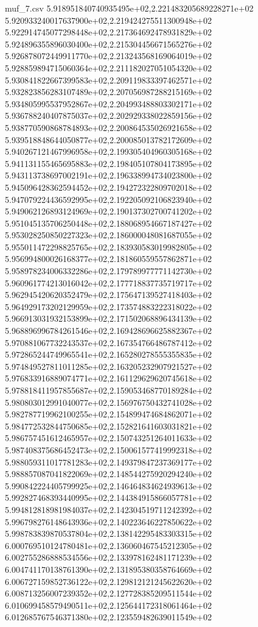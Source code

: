 \begin{filecontents*}{muf_7.csv}
5.918951840740935495e+02,2.221483205689228271e+02
5.920933240017637900e+02,2.219424275511300948e+02
5.922914745077298448e+02,2.217364692478931829e+02
5.924896355896030400e+02,2.215304456671565276e+02
5.926878072449911770e+02,2.213243568169064019e+02
5.928859894715060364e+02,2.211182027051054320e+02
5.930841822667399583e+02,2.209119833397462571e+02
5.932823856283107489e+02,2.207056987288215169e+02
5.934805995537952867e+02,2.204993488803302171e+02
5.936788240407875037e+02,2.202929338022859156e+02
5.938770590868784893e+02,2.200864535026921658e+02
5.939518848644050877e+02,2.200085013782172609e+02
5.940267121467996958e+02,2.199305404960305168e+02
5.941131155465695883e+02,2.198405107804173895e+02
5.943113738697002191e+02,2.196338994734023800e+02
5.945096428362594452e+02,2.194272322809702018e+02
5.947079224436592995e+02,2.192205092106823940e+02
5.949062126893124969e+02,2.190137302700741202e+02
5.951045135706250448e+02,2.188068954667187427e+02
5.953028250850227323e+02,2.186000048081687055e+02
5.955011472298825765e+02,2.183930583019982805e+02
5.956994800026168377e+02,2.181860559557862871e+02
5.958978234006332286e+02,2.179789977771142730e+02
5.960961774213016042e+02,2.177718837735719717e+02
5.962945420620352479e+02,2.175647139527418403e+02
5.964929173202129959e+02,2.173574883222318022e+02
5.966913031932153899e+02,2.171502068896434139e+02
5.968896996784261546e+02,2.169428696625882367e+02
5.970881067732243537e+02,2.167354766486787412e+02
5.972865244749965541e+02,2.165280278555355835e+02
5.974849527811011285e+02,2.163205232907921527e+02
5.976833916889074771e+02,2.161129629620745618e+02
5.978818411957855687e+02,2.159053468770189284e+02
5.980803012991040077e+02,2.156976750432741028e+02
5.982787719962100255e+02,2.154899474684862071e+02
5.984772532844750685e+02,2.152821641603031821e+02
5.986757451612465957e+02,2.150743251264011633e+02
5.987408375686452473e+02,2.150061577419992318e+02
5.988059311017781283e+02,2.149379847237369177e+02
5.988857087041822069e+02,2.148544275920294240e+02
5.990842224405799925e+02,2.146464834624939613e+02
5.992827468393440995e+02,2.144384915866057781e+02
5.994812818981984037e+02,2.142304519711242392e+02
5.996798276148643936e+02,2.140223646227850622e+02
5.998783839870537804e+02,2.138142295483303315e+02
6.000769510124780481e+02,2.136060467545212305e+02
6.002755286888534556e+02,2.133978162481171239e+02
6.004741170138761390e+02,2.131895380358764669e+02
6.006727159852736122e+02,2.129812121245622620e+02
6.008713256007239352e+02,2.127728385209511544e+02
6.010699458579490511e+02,2.125644172318061464e+02
6.012685767546371380e+02,2.123559482639011549e+02

\end{filecontents*}
